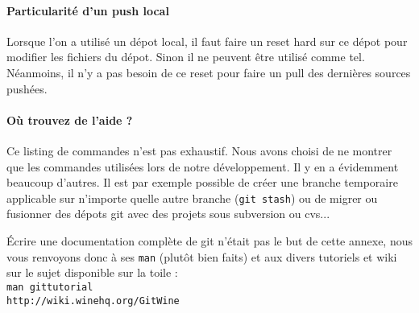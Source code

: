 \paragraph{Particularité d'un push local}
Lorsque l'on a utilisé un dépot local, il faut faire un reset hard sur ce dépot pour modifier les fichiers du dépot. Sinon il ne peuvent être utilisé comme tel. Néanmoins, il n'y a pas besoin de ce reset pour faire un pull des dernières sources pushées.

\paragraph{Où trouvez de l'aide ?}
Ce listing de commandes n'est pas exhaustif. Nous avons choisi de ne montrer que les commandes utilisées lors de notre développement. Il y en a évidemment beaucoup d'autres. Il est par exemple possible de créer une branche temporaire applicable sur n'importe quelle autre branche (\verb|git stash|) ou de migrer ou fusionner des dépots git avec des projets sous subversion ou cvs... 

Écrire une documentation complète de git n'était pas le but de cette annexe, nous vous renvoyons donc à ses \verb|man| (plutôt bien faits) et aux divers tutoriels et wiki sur le sujet disponible sur la toile : \\

\verb|man gittutorial|\\
\verb|http://wiki.winehq.org/GitWine|


